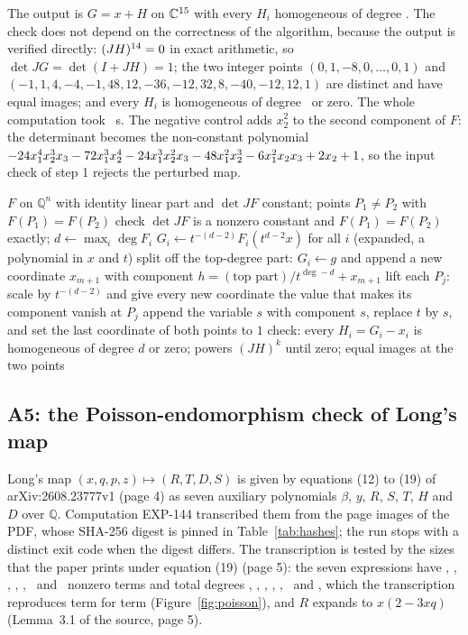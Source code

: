 \documentclass[11pt]{article}
\theoremstyle{remark}
\newcommand{\C}{\mathbb{C}}
\newcommand{\Q}{\mathbb{Q}}
\newcommand{\EXP}[1]{\mbox{EXP-#1}}
\begin{document}
The output is $G=x+H$ on $\C^{\nhomdim}$ with every $H_i$ homogeneous of degree \nhomdeg. The check does not depend on the correctness of the algorithm, because the output is verified directly: $(JH)^{14}=0$ in exact arithmetic, so $\det JG=\det(I+JH)=1$; the two integer points $(0,1,-8,0,\dots,0,1)$ and $(-1,1,4,-4,-1,48,12,-36,-12,32,8,-40,-12,12,1)$ are distinct and have equal images; and every $H_i$ is homogeneous of degree \nhomdeg\ or zero. The whole computation took \nhomseconds\ s. The negative control adds $x_2^2$ to the second component of $F$: the determinant becomes the non-constant polynomial $-24 x_1^4 x_2^3 x_3 - 72 x_1^3 x_2^4 - 24 x_1^3 x_2^2 x_3 - 48 x_1^2 x_2^3 - 6 x_1^2 x_2 x_3 + 2 x_2 + 1$, so the input check of step 1 rejects the perturbed map.

\begin{algorithm}[t]
\caption{A4, homogenization of a Keller map with a collision.}\label{alg:a4}
\begin{algorithmic}[1]
\Require $F$ on $\Q^n$ with identity linear part and $\det JF$ constant; points $P_1\ne P_2$ with $F(P_1)=F(P_2)$
\State check $\det JF$ is a nonzero constant and $F(P_1)=F(P_2)$ exactly; $d\gets\max_i\deg F_i$
\State $G_i\gets t^{-(d-2)}F_i(t^{d-2}x)$ for all $i$ (expanded, a polynomial in $x$ and $t$)
 
\State split off the top-degree part: $G_i\gets g$ and append a new coordinate $x_{m+1}$ with component $h=(\text{top part})/t^{\deg-d}+x_{m+1}$
\EndWhile \EndFor
\State lift each $P_j$: scale by $t^{-(d-2)}$ and give every new coordinate the value that makes its component vanish at $P_j$
\State append the variable $s$ with component $s$, replace $t$ by $s$, and set the last coordinate of both points to $1$
\State check: every $H_i=G_i-x_i$ is homogeneous of degree $d$ or zero; powers $(JH)^k$ until zero; equal images at the two points
\end{algorithmic}
\end{algorithm}

\subsection{A5: the Poisson-endomorphism check of Long's map}\label{sec:a5}

Long's map $(x,q,p,z)\mapsto(R,T,D,S)$ is given by equations (12) to (19) of arXiv:2608.23777v1 (page 4) as seven auxiliary polynomials $\beta$, $y$, $R$, $S$, $T$, $H$ and $D$ over $\Q$. Computation \EXP{144} transcribed them from the page images of the PDF, whose SHA-256 digest is pinned in Table~\ref{tab:hashes}; the run stops with a distinct exit code when the digest differs. The transcription is tested by the sizes that the paper prints under equation (19) (page 5): the seven expressions have \nsizebetaterms, \nsizeyterms, \nsizeRterms, \nsizeSterms, \nsizeTterms, \nsizeHterms\ and \nsizeDterms\ nonzero terms and total degrees \nsizebetadeg, \nsizeydeg, \nsizeRdeg, \nsizeSdeg, \nsizeTdeg, \nsizeHdeg\ and \nsizeDdeg, which the transcription reproduces term for term (Figure~\ref{fig:poisson}), and $R$ expands to $x(2-3xq)$ (Lemma~3.1 of the source, page 5).
\end{document}
